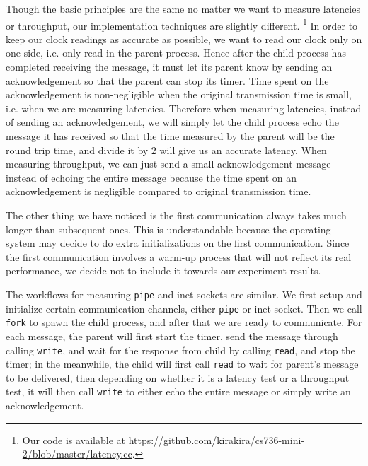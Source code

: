\documentclass[11pt,conference]{IEEEtran}
\begin{document}
Though the basic principles are the same no matter we want to measure latencies or throughput, our implementation techniques are slightly different.
\footnote{Our code is available at \url{https://github.com/kirakira/cs736-mini-2/blob/master/latency.cc}.}
In order to keep our clock readings as accurate as possible, we want to read our clock only on one side, i.e. only read in the parent process.
Hence after the child process has completed receiving the message, it must let its parent know by sending an acknowledgement so that the parent can stop its timer.
Time spent on the acknowledgement is non-negligible when the original transmission time is small, i.e. when we are measuring latencies.
Therefore when measuring latencies, instead of sending an acknowledgement, we will simply let the child process echo the message it has received so that the time measured by the parent will be the round trip time, and divide it by $2$ will give us an accurate latency.
When measuring throughput, we can just send a small acknowledgement message instead of echoing the entire message because the time spent on an acknowledgement is negligible compared to original transmission time.

The other thing we have noticed is the first communication always takes much longer than subsequent ones.
This is understandable because the operating system may decide to do extra initializations on the first communication.
Since the first communication involves a warm-up process that will not reflect its real performance, we decide not to include it towards our experiment results.

The workflows for measuring \texttt{pipe} and inet sockets are similar.
We first setup and initialize certain communication channels, either \texttt{pipe} or inet socket.
Then we call \texttt{fork} to spawn the child process, and after that we are ready to communicate.
For each message, the parent will first start the timer, send the message through calling \texttt{write}, and wait for the response from child by calling \texttt{read}, and stop the timer; in the meanwhile, the child will first call \texttt{read} to wait for parent's message to be delivered, then depending on whether it is a latency test or a throughput test, it will then call \texttt{write} to either echo the entire message or simply write an acknowledgement.
\end{document}
